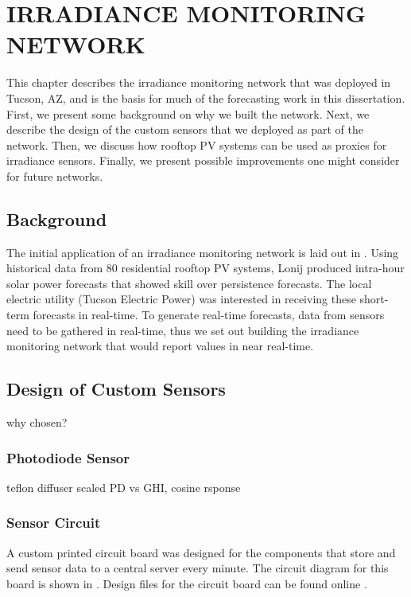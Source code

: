 \chapter{IRRADIANCE MONITORING NETWORK}
\label{chap:sens_net}

This chapter describes the irradiance monitoring network that was
deployed in Tucson, AZ, and is the basis for much of the forecasting
work in this dissertation.
First, we present some background on why we built the network.
Next, we describe the design of the custom sensors that we deployed as
part of the network.
Then, we discuss how rooftop PV systems can be used as proxies for
irradiance sensors.
Finally, we present possible improvements one might consider for
future networks.

\section{Background}

The initial application of an irradiance monitoring network is laid
out in \cite{Lonij2013}.
Using historical data from 80 residential rooftop PV systems, Lonij
\etal produced intra-hour solar power forecasts that showed skill over
persistence forecasts.
The local electric utility (Tucson Electric Power) was interested in
receiving these short-term forecasts in real-time.
To generate real-time forecasts, data from sensors need to be gathered
in real-time, thus we set out building the irradiance monitoring
network that would report values in near real-time.

\section{Design of Custom Sensors}

why chosen?


\subsection{Photodiode Sensor}
\label{sec:photodiode}

teflon diffuser
scaled PD vs GHI, cosine rsponse

\subsection{Sensor Circuit}

A custom printed circuit board was designed for the components that
store and send sensor data to a central server every minute.
The circuit diagram for this board is shown in .
Design files for the circuit board can be found online \cite{sensorrepo}.

